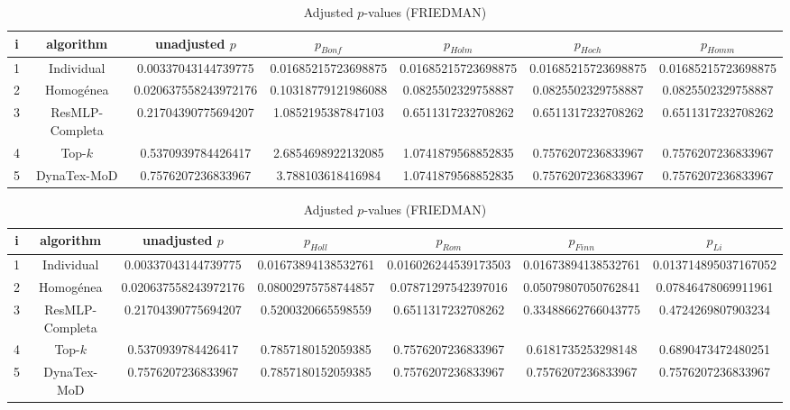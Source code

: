 \documentclass[a4paper,10pt]{article}
\begin{document}
\begin{landscape}
\begin{table}[!htp]
\centering\scriptsize
\caption{Adjusted $p$-values (FRIEDMAN)}
\begin{tabular}{ccccccc}
i&algorithm&unadjusted $p$&$p_{Bonf}$&$p_{Holm}$&$p_{Hoch}$&$p_{Homm}$\\
\hline
1&Individual&0.00337043144739775&0.01685215723698875&0.01685215723698875&0.01685215723698875&0.01685215723698875\\
2&Homogénea&0.020637558243972176&0.10318779121986088&0.0825502329758887&0.0825502329758887&0.0825502329758887\\
3&ResMLP-Completa&0.21704390775694207&1.0852195387847103&0.6511317232708262&0.6511317232708262&0.6511317232708262\\
4&Top-$k$&0.5370939784426417&2.6854698922132085&1.0741879568852835&0.7576207236833967&0.7576207236833967\\
5&DynaTex-MoD&0.7576207236833967&3.788103618416984&1.0741879568852835&0.7576207236833967&0.7576207236833967\\
\hline
\end{tabular}
\end{table}

\begin{table}[!htp]
\centering\scriptsize
\caption{Adjusted $p$-values (FRIEDMAN)}
\begin{tabular}{ccccccc}
i&algorithm&unadjusted $p$&$p_{Holl}$&$p_{Rom}$&$p_{Finn}$&$p_{Li}$\\
\hline
1&Individual&0.00337043144739775&0.01673894138532761&0.016026244539173503&0.01673894138532761&0.013714895037167052\\
2&Homogénea&0.020637558243972176&0.08002975758744857&0.07871297542397016&0.05079807050762841&0.07846478069911961\\
3&ResMLP-Completa&0.21704390775694207&0.5200320665598559&0.6511317232708262&0.33488662766043775&0.4724269807903234\\
4&Top-$k$&0.5370939784426417&0.7857180152059385&0.7576207236833967&0.6181735253298148&0.6890473472480251\\
5&DynaTex-MoD&0.7576207236833967&0.7857180152059385&0.7576207236833967&0.7576207236833967&0.7576207236833967\\
\hline
\end{tabular}
\end{table}


\newpage


\end{landscape}
\end{document}
